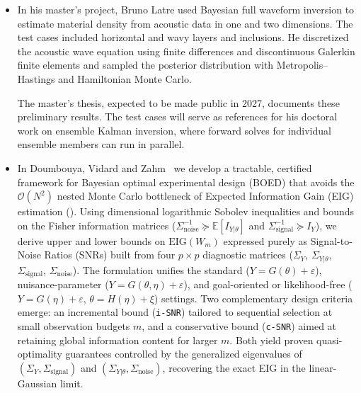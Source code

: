 \begin{itemize}
\item[T4.2] \label{sec:wp4:stochastic methods}%

  In his master's project, Bruno Latre used Bayesian full waveform
  inversion to estimate material density from acoustic data in one and
  two dimensions. The test cases included horizontal and wavy layers
  and inclusions. He discretized the acoustic wave equation using
  finite differences and discontinuous Galerkin finite elements and
  sampled the posterior distribution with Metropolis--Hastings and
  Hamiltonian Monte Carlo.

  The master's thesis, expected to be made public in 2027, documents
  these preliminary results. The test cases will serve as references
  for his doctoral work on ensemble Kalman inversion, where forward
  solves for individual ensemble members can run in parallel.

\item[T4.3] \label{sec:wp4:sensor-placement}%
  In Doumbouya, Vidard and Zahm~\cite{hal-05768497} we develop a
  tractable, certified framework for Bayesian optimal experimental design (BOED)
  that avoids the $\mathcal{O}(N^2)$ nested Monte Carlo bottleneck of Expected
  Information Gain (EIG) estimation ().
  Using dimensional logarithmic Sobolev inequalities and bounds on the Fisher
  information matrices ($\Sigma_{\mathrm{noise}}^{-1} \succeq \mathbb{E}[I_{Y|\theta}]$
  and $\Sigma_{\mathrm{signal}}^{-1} \succeq I_Y$), we derive upper
  and lower bounds on $\mathrm{EIG}(W_m)$ expressed purely as Signal-to-Noise
  Ratios (SNRs) built from four $p \times p$ diagnostic matrices
  ($\Sigma_Y$, $\Sigma_{Y|\theta}$, $\Sigma_{\mathrm{signal}}$, $\Sigma_{\mathrm{noise}}$).
  The formulation unifies the standard ($Y = G(\theta) + \varepsilon$),
  nuisance-parameter ($Y = G(\theta, \eta) + \varepsilon$), and goal-oriented
  or likelihood-free ($Y = G(\eta) + \varepsilon$, $\theta = H(\eta) + \xi$)
  settings. Two complementary design criteria emerge: an incremental bound
  (\texttt{i-SNR}) tailored to sequential selection at small observation budgets $m$,
  and a conservative bound (\texttt{c-SNR}) aimed at retaining global information
  content for larger $m$. Both yield proven quasi-optimality guarantees controlled
  by the generalized eigenvalues of $(\Sigma_Y, \Sigma_{\mathrm{signal}})$ and
  $(\Sigma_{Y|\theta}, \Sigma_{\mathrm{noise}})$, recovering the exact EIG in
  the linear-Gaussian limit.


\end{itemize}
